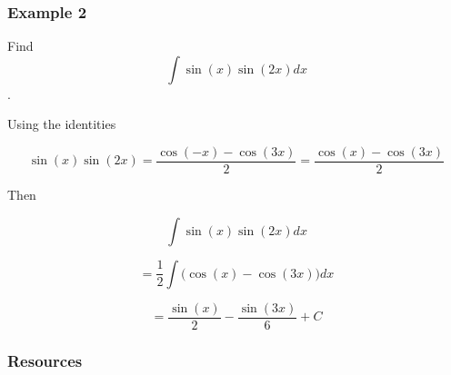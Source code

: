 \subsubsection{Example 2}
\label{sss:exam-5bdd}


Find\[
\int\sin(x)\sin(2x)dx
\] .


Using the identities


\[
\sin(x)\sin(2x)=\frac{\cos(-x)-\cos(3x)}{2}=\frac{\cos(x)-\cos(3x)}{2}
\]

Then


\[
\int\sin(x)\sin(2x)dx
\]

\[
=\frac{1}{2}\int\Big(\cos(x)-\cos(3x)\Big)dx
\]

\[
=\frac{\sin(x)}{2}-\frac{\sin(3x)}{6}+C
\]


\subsubsection{Resources}
\label{sss:reso-55b5}


